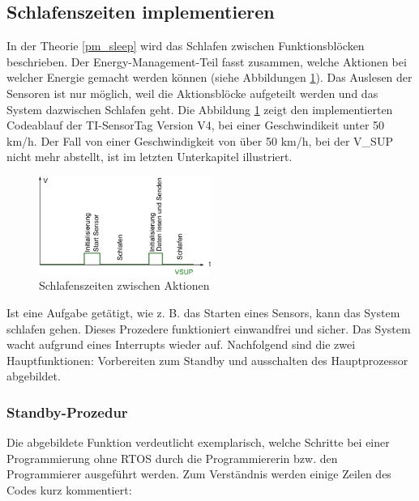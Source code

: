\subsection{Schlafenszeiten implementieren}
\label{sleep_funktion}

In der Theorie \ref{pm_sleep} wird das Schlafen zwischen Funktionsblöcken beschrieben. Der Energy-Management-Teil fasst zusammen, welche Aktionen bei welcher Energie gemacht werden können (siehe Abbildungen \ref{warten_zw_bloecken}). Das Auslesen der Sensoren ist nur möglich, weil die Aktionsblöcke aufgeteilt werden und das System dazwischen Schlafen geht. Die Abbildung \ref{warten_zw_bloecken} zeigt den implementierten Codeablauf der TI-SensorTag Version V4, bei einer Geschwindikeit unter 50 km/h. Der Fall von einer Geschwindigkeit von über 50 km/h, bei der V\_SUP nicht mehr abstellt, ist im letzten Unterkapitel illustriert.\\

\begin{figure}[ht]
  \includegraphics[width=0.5\textwidth]{3Vorgehen/imag/schlafen_funktionen.png}
  \caption{Schlafenszeiten zwischen Aktionen}
  \label{warten_zw_bloecken}
\end{figure}

Ist eine Aufgabe getätigt, wie z. B. das Starten eines Sensors, kann das System schlafen gehen. Dieses Prozedere funktioniert einwandfrei und sicher. Das System wacht aufgrund eines Interrupts wieder auf. Nachfolgend sind die zwei Hauptfunktionen: Vorbereiten zum Standby und ausschalten des Hauptprozessor abgebildet.

\subsubsection{Standby-Prozedur}
\label{vorbereiten}

Die abgebildete Funktion verdeutlicht exemplarisch, welche Schritte bei einer Programmierung ohne RTOS durch die Programmiererin bzw. den Programmierer ausgeführt werden.  Zum Verständnis werden einige Zeilen des Codes kurz kommentiert:\\ 

